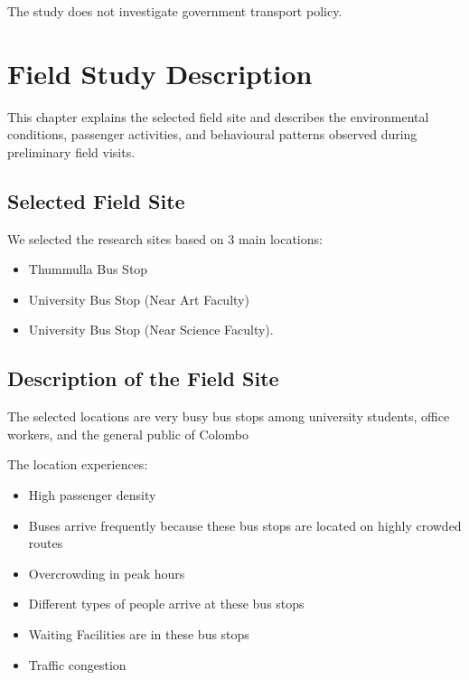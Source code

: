 \documentclass[12pt,a4paper]{report}
\begin{document}
The study does not investigate government transport policy.


\chapter{Field Study Description}

This chapter explains the selected field site and describes the environmental conditions,
passenger activities, and behavioural patterns observed during preliminary field visits.


\section{Selected Field Site}

We selected the research sites based on 3 main locations: 
\begin{itemize}[noitemsep]
\item Thummulla Bus Stop
\item University Bus Stop (Near Art Faculty)
\item University Bus Stop (Near Science Faculty).
\end{itemize}




\section{Description of the Field Site}

The selected locations are very busy bus stops among university students, office workers, and the general public of Colombo

The location experiences:

\begin{itemize}[noitemsep]

\item High passenger density

\item Buses arrive frequently because these bus stops are located on highly crowded routes

\item Overcrowding in peak hours

\item Different types of people arrive at these bus stops


\item Waiting Facilities are in these bus stops


\item Traffic congestion


\end{itemize}
\end{document}
